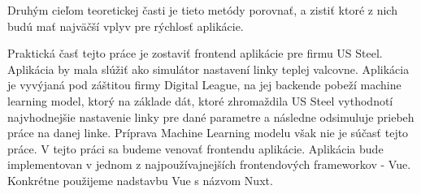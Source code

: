 Druhým cieľom teoretickej časti je tieto metódy porovnať, a zistiť ktoré z nich budú mať najväčší vplyv pre rýchlosť aplikácie.

Praktická časť tejto práce je zostaviť frontend aplikácie pre firmu US Steel. Aplikácia by mala slúžiť ako simulátor nastavení linky teplej valcovne. Aplikácia je vyvýjaná pod záštitou firmy Digital League, na jej backende pobeží machine learning model, ktorý na základe dát, ktoré zhromaždila US Steel vythodnotí najvhodnejšie nastavenie linky pre dané parametre a následne odsimuluje priebeh práce na danej linke. Príprava Machine Learning modelu však nie je súčasť tejto práce. V tejto práci sa budeme venovať frontendu aplikácie. Aplikácia bude implementovan v jednom z najpoužívajnejších frontendových frameworkov - Vue. Konkrétne použijeme nadstavbu Vue s názvom Nuxt.
